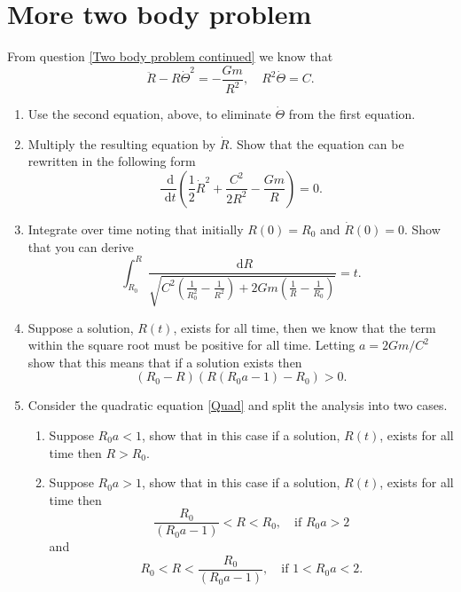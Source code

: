 \documentclass[]{article}
\newcommand{\bb}{\begin{equation}}
\newcommand{\ee}{\end{equation}}
\newcommand{\rd}{\text{ d}}
\newcommand{\eqn}[1]{equation \eqref{#1}}
\renewcommand{\l}{\left(}
\renewcommand{\r}{\right)}
\begin{document}
\section{More two body problem}
From question \ref{Two body problem continued} we know that
\bb
\ddot{R}-R\dot{\Theta}^2=-\frac{Gm}{R^2},\quad R^2\dot{\Theta}=C.
\ee
\begin{enumerate}
\item Use the second equation, above, to eliminate $\dot{\Theta}$ from the first equation.
\item Multiply the resulting equation by $\dot{R}$. Show that the equation can be rewritten in the following form
\bb
\frac{\rd}{\rd t}\l\frac{1}{2}\dot{R}^2+\frac{C^2}{2R^2}-\frac{Gm}{R}\r=0.
\ee
\item Integrate over time noting that initially $R(0)=R_0$ and $\dot{R}(0)=0$. Show that you can derive
\bb
\int^R_{R_0}\frac{\rd R}{\sqrt{C^2\l\frac{1}{R_0^2}-\frac{1}{R^2}\r+2Gm\l\frac{1}{R}-\frac{1}{R_0}\r}}=t.
\ee
\item Suppose a solution, $R(t)$, exists for all time, then we know that the term within the square root must be positive for all time. Letting $a=2Gm/C^2$ show that this means that if a solution exists then
\bb
(R_0-R)(R(R_0a-1)-R_0)>0.\label{Quad}
\ee
\item Consider the quadratic \eqn{Quad} and split the analysis into two cases.
\begin{enumerate}
\item Suppose $R_0a<1$, show that in this case if a solution, $R(t)$, exists for all time then $R>R_0$.
\item Suppose $R_0a>1$, show that in this case if a solution, $R(t)$, exists for all time then
\bb
\frac{R_0}{(R_0a-1)}<R<R_0, \quad \textrm{if $R_0a>2$}
\ee
 and
\bb
R_0<R<\frac{R_0}{(R_0a-1)},\quad \textrm{if $1<R_0a<2$.}
\ee
\end{enumerate}
\end{enumerate}
\end{document}
